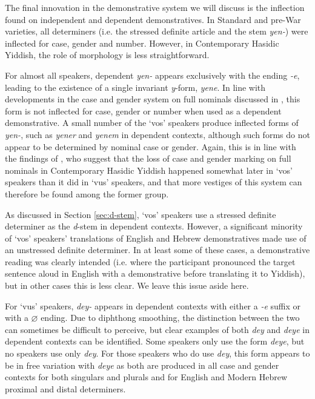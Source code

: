 \documentclass[output=paper, hidelinks]{langscibook}
\begin{document}
The final innovation in the demonstrative system we will discuss is the inflection found on independent and dependent demonstratives. In Standard and pre-War varieties, all determiners (i.e. the stressed definite article and the stem \textit{yen-}) were inflected for case, gender and number.%
 However, in Contemporary Hasidic Yiddish, the role of morphology is less straightforward. 

For almost all speakers, dependent \textit{yen-} appears exclusively with the ending \textit{-e}, leading to the existence of a single invariant \textit{y}-form, \textit{yene}. In line with developments in the case and gender system on full nominals discussed in \citet{Author20, Author21}, this form is not inflected for case, gender or number when used as a dependent demonstrative. A small number of the `vos' speakers produce inflected forms of \textit{yen-}, such as \textit{yener} and \textit{yenem} in dependent contexts, although such forms do not appear to be determined by nominal case or gender. Again, this is in line with the findings of \citet{Author21}, who suggest that the loss of case and gender marking on full nominals in Contemporary Hasidic Yiddish happened somewhat later in `vos' speakers than it did in `vus' speakers, and that more vestiges of this system can therefore be found among the former group.

As discussed in Section \ref{sec:d-stem}, `vos' speakers use a stressed definite determiner as the \textit{d}-stem in dependent contexts. However, a significant minority of `vos' speakers' translations of English and Hebrew demonstratives made use of an unstressed definite determiner. In at least some of these cases, a demonstrative reading was clearly intended (i.e. where the participant pronounced the target sentence aloud in English with a demonstrative before translating it to Yiddish), but in other cases this is less clear. We leave this issue aside here. 

For `vus' speakers, \textit{dey-} appears in dependent contexts with either a \textit{-e} suffix or with a $\varnothing$ ending. Due to diphthong smoothing, the distinction between the two can sometimes be difficult to perceive, but clear examples of both \textit{dey} and \textit{deye} in dependent contexts can be identified. Some speakers only use the form \textit{deye}, but no speakers use only \textit{dey}. For those speakers who do use \textit{dey}, this form appears to be in free variation with \textit{deye} as both are produced in all case and gender contexts for both singulars and plurals and for English and Modern Hebrew proximal and distal determiners. 
\end{document}
